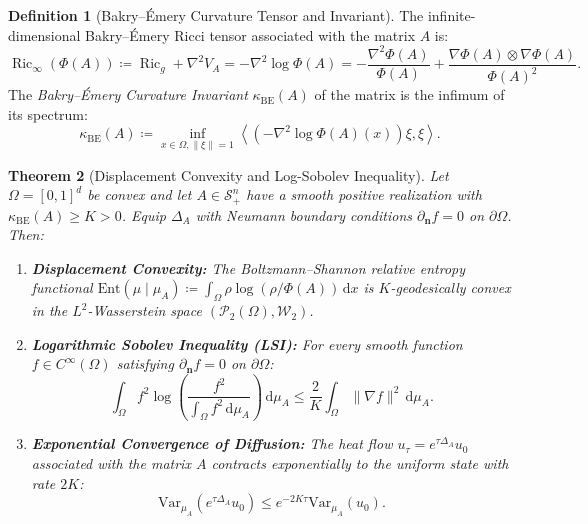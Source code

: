 \documentclass[11pt,a4paper,reqno]{amsart}
\newtheorem{theorem}{Theorem}[section]
\theoremstyle{definition}
\newtheorem{definition}[theorem]{Definition}
\numberwithin{equation}{section}
\newcommand{\dif}{\,\mathrm{d}}
\newcommand{\Ric}{\operatorname{Ric}}
\begin{document}
\begin{definition}[Bakry--\'Emery Curvature Tensor and Invariant]
The infinite-dimensional Bakry--\'Emery Ricci tensor associated with the matrix $A$ is:
\begin{equation}
    \Ric_\infty(\Phi(A)) \coloneqq \Ric_g + \nabla^2 V_A = -\nabla^2 \log \Phi(A) = -\frac{\nabla^2 \Phi(A)}{\Phi(A)} + \frac{\nabla \Phi(A) \otimes \nabla \Phi(A)}{\Phi(A)^2}.
\end{equation}
The \emph{Bakry--\'Emery Curvature Invariant} $\kappa_{\mathrm{BE}}(A)$ of the matrix is the infimum of its spectrum:
\begin{equation}
    \kappa_{\mathrm{BE}}(A) \coloneqq \inf_{x \in \Omega, \|\xi\|=1} \left\langle \left( -\nabla^2 \log \Phi(A)(x) \right) \xi, \xi \right\rangle.
\end{equation}
\end{definition}

\begin{theorem}[Displacement Convexity and Log-Sobolev Inequality]
\label{thm:bakry_emery}
Let $\Omega = [0, 1]^d$ be convex and let $A \in \mathcal{S}_+^n$ have a smooth positive realization with $\kappa_{\mathrm{BE}}(A) \ge K > 0$. Equip $\Delta_A$ with Neumann boundary conditions $\partial_{\mathbf{n}} f = 0$ on $\partial\Omega$. Then:
\begin{enumerate}[label=(\alph*)]
    \item \textbf{Displacement Convexity:} The Boltzmann--Shannon relative entropy functional $\mathrm{Ent}( \mu \mid \mu_A ) \coloneqq \int_\Omega \rho \log(\rho / \Phi(A)) \dif x$ is $K$-geodesically convex in the $L^2$-Wasserstein space $(\mathcal{P}_2(\Omega), \mathcal{W}_2)$.
    \item \textbf{Logarithmic Sobolev Inequality (LSI):} For every smooth function $f \in C^\infty(\Omega)$ satisfying $\partial_{\mathbf{n}} f = 0$ on $\partial\Omega$:
    \begin{equation}
        \int_\Omega f^2 \log\left(\frac{f^2}{\int_\Omega f^2 \dif\mu_A}\right) \dif\mu_A \le \frac{2}{K} \int_\Omega \|\nabla f\|^2 \dif\mu_A.
    \end{equation}
    \item \textbf{Exponential Convergence of Diffusion:} The heat flow $u_\tau = e^{\tau \Delta_A} u_0$ associated with the matrix $A$ contracts exponentially to the uniform state with rate $2K$:
    \begin{equation}
        \mathrm{Var}_{\mu_A}(e^{\tau \Delta_A} u_0) \le e^{-2K\tau} \mathrm{Var}_{\mu_A}(u_0).
    \end{equation}
\end{enumerate}
\end{theorem}
\end{document}
